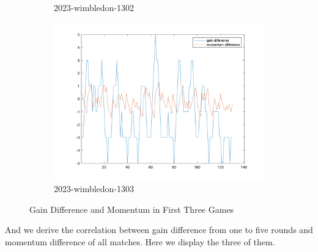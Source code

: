 \begin{figure}[H]
\begin{subfigure}[b]{0.34\textwidth}
        \caption{2023-wimbledon-1302}
    \end{subfigure}\hspace{-0.02\textwidth}
    \begin{subfigure}[b]{0.34\textwidth}
        \includegraphics[width=\linewidth]{mainmatter/photos/diff_match3.png}
        \caption{2023-wimbledon-1303}
    \end{subfigure}
    \caption{Gain Difference and Momentum in First Three Games}
    \label{fig:Gain Difference and Momentum}
\end{figure}

And we derive the correlation between gain difference from one to five rounds 
and momentum difference of all matches. Here we display the three of them.


